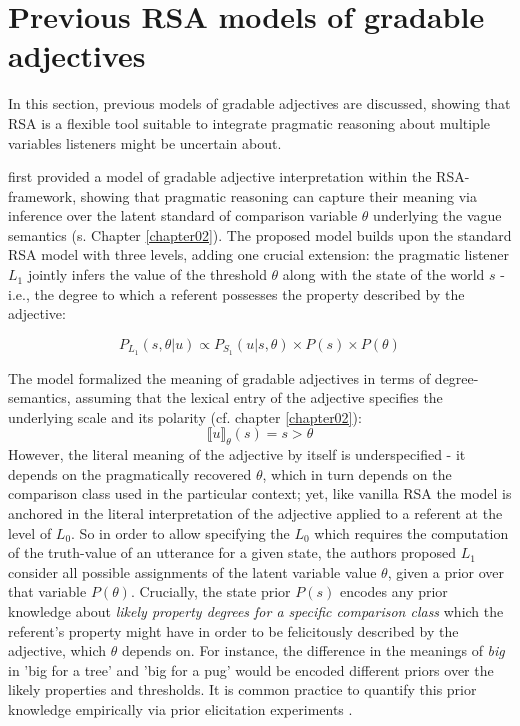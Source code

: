 \section{Previous RSA models of gradable adjectives}
In this section, previous models of gradable adjectives are discussed, showing that RSA is a flexible tool suitable to integrate pragmatic reasoning about multiple variables listeners might be uncertain about.

\textcite{lassiter2013context} first provided a model of gradable adjective interpretation within the RSA-framework, showing that pragmatic reasoning can capture their meaning via inference over the latent standard of comparison variable $\theta$ underlying the vague semantics (s. Chapter \ref{chapter02}). %
The proposed model builds upon the standard RSA model with three levels, adding one crucial extension: the pragmatic listener $L_1$ jointly infers the value of the threshold $\theta$ along with the state of the world $s$ - i.e., the degree to which a referent possesses the property described by the adjective:

$$P_{L_1} (s, \theta | u) \propto P_{S_1} (u | s, \theta) \times P (s) \times P(\theta)$$ 

The model formalized the meaning of gradable adjectives in terms of degree-semantics, assuming that the lexical entry of the adjective specifies the underlying scale and its polarity (cf. chapter \ref{chapter02}):
$$\llbracket u \rrbracket_{\theta} (s) = s > \theta$$
However, the literal meaning of the adjective by itself is underspecified - it depends on the pragmatically recovered $\theta$, which in turn depends on the comparison class used in the particular context; yet, like vanilla RSA the model is anchored in the literal interpretation of the adjective applied to a referent at the level of $L_0$.  
So in order to allow specifying the $L_0$ which requires the computation of the truth-value of an utterance for a given state, the authors proposed $L_1$ consider all possible assignments of the latent variable value $\theta$, given a prior over that variable $P(\theta)$. Crucially, the state prior $P(s)$ encodes any prior knowledge about \emph{likely property degrees for a specific comparison class} which the referent's property might have in order to be felicitously described by the adjective, which $\theta$ depends on. For instance, the difference in the meanings of \emph{big} in 'big for a tree' and 'big for a pug' would be encoded different  priors over the likely properties and thresholds. It is common practice to quantify this prior knowledge empirically via prior elicitation experiments \parencite{problang}.

